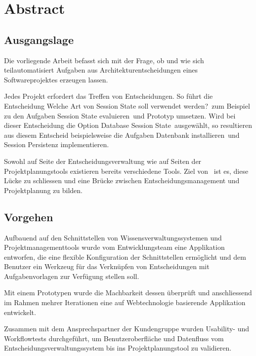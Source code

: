\chapter{Abstract}

	\section{Ausgangslage}

	Die vorliegende Arbeit befasst sich mit der Frage,
	ob und wie sich teilautomatisiert Aufgaben aus Architekturentscheidungen eines Softwareprojektes erzeugen lassen.

	Jedes Projekt erfordert das Treffen von Entscheidungen.
	So führt die Entscheidung \flqq Welche Art von Session State soll verwendet werden?\frqq\ zum Beispiel zu den Aufgaben
	\flqq Session State evaluieren\frqq\ und \flqq Prototyp umsetzen\frqq.
	Wird bei dieser Entscheidung die Option \flqq Database Session State\frqq\ ausgewählt,
	so resultieren aus diesem Entscheid beispielsweise die Aufgaben \flqq Datenbank installieren\frqq\ und
	\flqq Session Persistenz implementieren\frqq.

	Sowohl auf Seite der Entscheidungsverwaltung wie auf Seiten der Projektplanungstools existieren bereits verschiedene Tools.
	Ziel von \eeppi\ ist es, diese Lücke zu schliessen und eine Brücke zwischen Entscheidungsmanagement und Projektplanung zu bilden.


	\section{Vorgehen}

	Aufbauend auf den Schnittstellen von Wissensverwaltungssystemen und Projektmanagementtools wurde vom Entwicklungsteam eine Applikation entworfen,
	die eine flexible Konfiguration der Schnittstellen ermöglicht
	und dem Benutzer ein Werkzeug für das Verknüpfen von Entscheidungen mit Aufgabenvorlagen zur Verfügung stellen soll.

	Mit einem Prototypen wurde die Machbarkeit dessen überprüft
	und anschliessend im Rahmen mehrer Iterationen eine auf Webtechnologie basierende Applikation entwickelt.

	Zusammen mit dem Ansprechspartner der Kundengruppe wurden Usability- und Workflowtests durchgeführt, um Benutzeroberfläche
	und Datenfluss vom Entscheidungsverwaltungssystem bis ins Projektplanungstool zu validieren.

